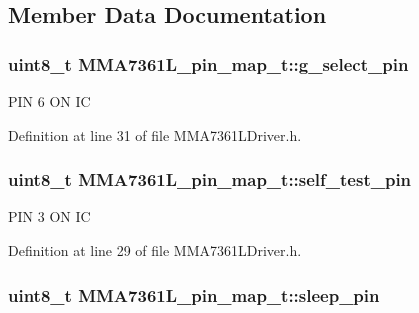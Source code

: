 \subsection{\-Member \-Data \-Documentation}
\hypertarget{struct_m_m_a7361_l__pin__map__t_a742fe49ea46a18d1ff7d40fabbb3fa2d}{
\subsubsection[{g\-\_\-select\-\_\-pin}]{\setlength{\rightskip}{0pt plus 5cm}uint8\-\_\-t {\bf \-M\-M\-A7361\-L\-\_\-pin\-\_\-map\-\_\-t\-::g\-\_\-select\-\_\-pin}}}\label{struct_m_m_a7361_l__pin__map__t_a742fe49ea46a18d1ff7d40fabbb3fa2d}

\begin{DoxyItemize}
\item \-P\-I\-N 6 \-O\-N \-I\-C 
\end{DoxyItemize}

\-Definition at line 31 of file \-M\-M\-A7361\-L\-Driver.\-h.

\hypertarget{struct_m_m_a7361_l__pin__map__t_a679a9f30750144cb8d4c31027af63c7c}{
\subsubsection[{self\-\_\-test\-\_\-pin}]{\setlength{\rightskip}{0pt plus 5cm}uint8\-\_\-t {\bf \-M\-M\-A7361\-L\-\_\-pin\-\_\-map\-\_\-t\-::self\-\_\-test\-\_\-pin}}}\label{struct_m_m_a7361_l__pin__map__t_a679a9f30750144cb8d4c31027af63c7c}

\begin{DoxyItemize}
\item \-P\-I\-N 3 \-O\-N \-I\-C 
\end{DoxyItemize}

\-Definition at line 29 of file \-M\-M\-A7361\-L\-Driver.\-h.

\hypertarget{struct_m_m_a7361_l__pin__map__t_a0c98167130063b54ae642ea994e67d87}{
\subsubsection[{sleep\-\_\-pin}]{\setlength{\rightskip}{0pt plus 5cm}uint8\-\_\-t {\bf \-M\-M\-A7361\-L\-\_\-pin\-\_\-map\-\_\-t\-::sleep\-\_\-pin}}}\label{struct_m_m_a7361_l__pin__map__t_a0c98167130063b54ae642ea994e67d87}


